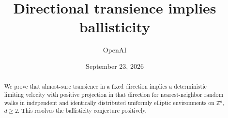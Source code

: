 \documentclass[11pt,a4paper]{article}
\title{Directional transience implies ballisticity}
\author{OpenAI}
\date{September 23, 2026}
\theoremstyle{definition}
\theoremstyle{remark}
\begin{document}
\maketitle
\begin{abstract}
We prove that almost-sure transience in a fixed direction implies a
deterministic limiting velocity with positive projection in that direction for
nearest-neighbor random walks in independent and identically distributed
uniformly elliptic environments on $\mathbb Z^d$, $d\ge2$. This resolves
the ballisticity conjecture positively.
\end{abstract}
\tableofcontents










\end{document}
